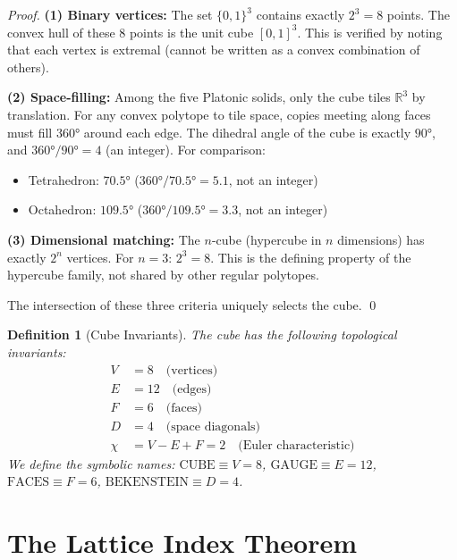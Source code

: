 \documentclass[twocolumn,showpacs,preprintnumbers,amsmath,amssymb,prd]{revtex4-2}
\newtheorem{definition}[theorem]{Definition}
\begin{document}
\begin{proof}
\textbf{(1) Binary vertices:} The set $\{0,1\}^3$ contains exactly $2^3 = 8$ points. The convex hull of these 8 points is the unit cube $[0,1]^3$. This is verified by noting that each vertex is extremal (cannot be written as a convex combination of others).

\textbf{(2) Space-filling:} Among the five Platonic solids, only the cube tiles $\mathbb{R}^3$ by translation. For any convex polytope to tile space, copies meeting along faces must fill $360°$ around each edge. The dihedral angle of the cube is exactly $90°$, and $360°/90° = 4$ (an integer). For comparison:
\begin{itemize}
\item Tetrahedron: $70.5°$ ($360°/70.5° = 5.1$, not an integer)
\item Octahedron: $109.5°$ ($360°/109.5° = 3.3$, not an integer)
\end{itemize}

\textbf{(3) Dimensional matching:} The $n$-cube (hypercube in $n$ dimensions) has exactly $2^n$ vertices. For $n=3$: $2^3 = 8$. This is the defining property of the hypercube family, not shared by other regular polytopes.

The intersection of these three criteria uniquely selects the cube. \qed
\end{proof}

\begin{definition}[Cube Invariants]
The cube has the following topological invariants:
\begin{align}
V &= 8 \quad \text{(vertices)} \\
E &= 12 \quad \text{(edges)} \\
F &= 6 \quad \text{(faces)} \\
D &= 4 \quad \text{(space diagonals)} \\
\chi &= V - E + F = 2 \quad \text{(Euler characteristic)}
\end{align}
We define the symbolic names: $\text{CUBE} \equiv V = 8$, $\text{GAUGE} \equiv E = 12$, $\text{FACES} \equiv F = 6$, $\text{BEKENSTEIN} \equiv D = 4$.
\end{definition}

\section{The Lattice Index Theorem}
\end{document}
